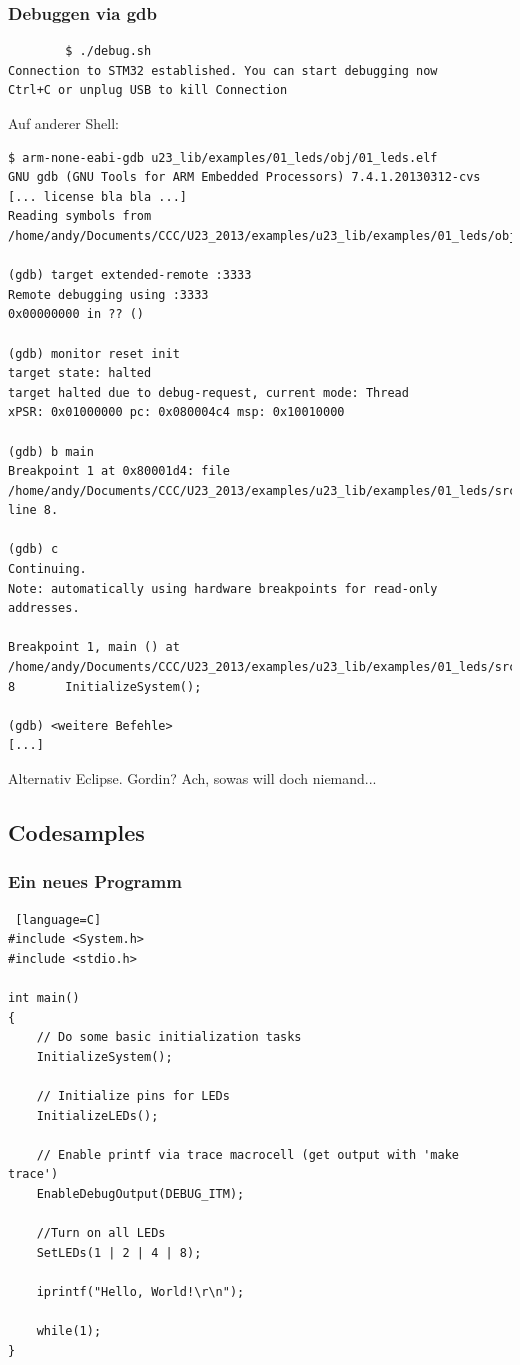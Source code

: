 \documentclass[ngerman,compress]{beamer}
\begin{document}
\begin{frame} [fragile]
	\frametitle{Debuggen via gdb}
		\begin{lstlisting}
		$ ./debug.sh 
Connection to STM32 established. You can start debugging now
Ctrl+C or unplug USB to kill Connection 
		\end{lstlisting}
\end{frame}

\begin{frame} [fragile]
Auf anderer Shell:
	\begin{lstlisting}
$ arm-none-eabi-gdb u23_lib/examples/01_leds/obj/01_leds.elf 
GNU gdb (GNU Tools for ARM Embedded Processors) 7.4.1.20130312-cvs
[... license bla bla ...]
Reading symbols from /home/andy/Documents/CCC/U23_2013/examples/u23_lib/examples/01_leds/obj/01_leds.elf...done.

(gdb) target extended-remote :3333
Remote debugging using :3333
0x00000000 in ?? ()

(gdb) monitor reset init
target state: halted
target halted due to debug-request, current mode: Thread 
xPSR: 0x01000000 pc: 0x080004c4 msp: 0x10010000

(gdb) b main
Breakpoint 1 at 0x80001d4: file /home/andy/Documents/CCC/U23_2013/examples/u23_lib/examples/01_leds/src/main.c, line 8.

(gdb) c
Continuing.
Note: automatically using hardware breakpoints for read-only addresses.

Breakpoint 1, main () at /home/andy/Documents/CCC/U23_2013/examples/u23_lib/examples/01_leds/src/main.c:8
8		InitializeSystem();

(gdb) <weitere Befehle> 
[...]
	\end{lstlisting}
	Alternativ Eclipse. Gordin? Ach, sowas will doch niemand...
\end{frame}

\subsection{Codesamples}

\begin{frame}[fragile]
	\frametitle{Ein neues Programm}
	\begin{lstlisting} [language=C]
#include <System.h>
#include <stdio.h>

int main()
{
    // Do some basic initialization tasks
    InitializeSystem();

    // Initialize pins for LEDs
    InitializeLEDs();

    // Enable printf via trace macrocell (get output with 'make trace')
    EnableDebugOutput(DEBUG_ITM);

    //Turn on all LEDs
    SetLEDs(1 | 2 | 4 | 8);

    iprintf("Hello, World!\r\n");

    while(1);
}
	\end{lstlisting}
\end{frame}
\end{document}
